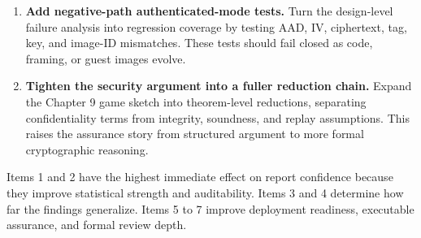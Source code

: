 {\begin{enumerate}
\item \textbf{Add negative-path authenticated-mode tests.}
Turn the design-level failure analysis into regression coverage by testing AAD,
IV, ciphertext, tag, key, and image-ID mismatches. These tests should fail closed
as code, framing, or guest images evolve.

\item \textbf{Tighten the security argument into a fuller reduction chain.}
Expand the Chapter 9 game sketch into theorem-level reductions, separating
confidentiality terms from integrity, soundness, and replay assumptions. This
raises the assurance story from structured argument to more formal cryptographic
reasoning.
\end{enumerate}

Items 1 and 2 have the highest immediate effect on report confidence because they
improve statistical strength and auditability. Items 3 and 4 determine how far the
findings generalize. Items 5 to 7 improve deployment readiness, executable
assurance, and formal review depth.
}

